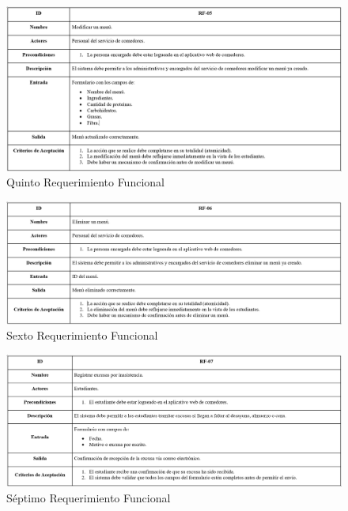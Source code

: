 \documentclass[stu, 12pt, letterpaper, donotrepeattitle, floatsintext, natbib]{apa7}
\begin{document}
\begin{figure}[H]
	\caption[]{Quinto Requerimiento Funcional}
	\label{Quinto Requerimiento Funcional}
	\includegraphics[width=1\linewidth]{Requerimientos Funcionales/5. Requerimiento Funcional.png}
\end{figure}

\begin{figure}[H]
	\caption[]{Sexto Requerimiento Funcional}
	\label{Sexto Requerimiento Funcional}
	\includegraphics[width=1\linewidth]{Requerimientos Funcionales/6. Requerimiento Funcional.png}
\end{figure}

\begin{figure}[H]
	\caption[]{Séptimo Requerimiento Funcional}
	\label{Séptimo Requerimiento Funcional}
	\includegraphics[width=1\linewidth]{Requerimientos Funcionales/7. Requerimiento Funcional.png}
\end{figure}
\end{document}
